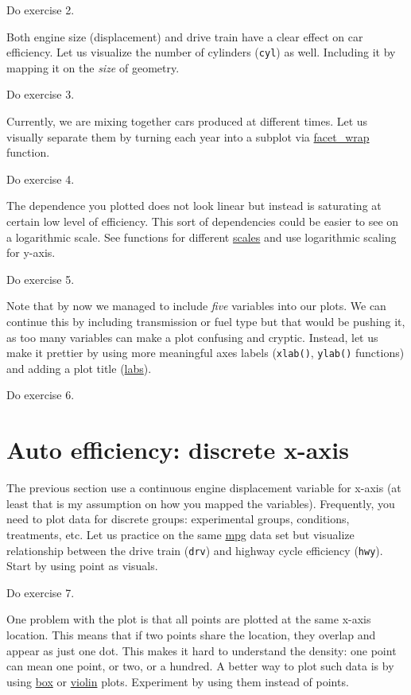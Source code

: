 \documentclass[
]{book}
\begin{document}
Do exercise 2.

Both engine size (displacement) and drive train have a clear effect on car efficiency. Let us visualize the number of cylinders (\texttt{cyl}) as well. Including it by mapping it on the \emph{size} of geometry.

Do exercise 3.

Currently, we are mixing together cars produced at different times. Let us visually separate them by turning each year into a subplot via \href{https://ggplot2.tidyverse.org/reference/facet_wrap.html}{facet\_wrap} function.

Do exercise 4.

The dependence you plotted does not look linear but instead is saturating at certain low level of efficiency. This sort of dependencies could be easier to see on a logarithmic scale. See functions for different \href{https://ggplot2.tidyverse.org/reference/scale_continuous.html}{scales} and use logarithmic scaling for y-axis.

Do exercise 5.

Note that by now we managed to include \emph{five} variables into our plots. We can continue this by including transmission or fuel type but that would be pushing it, as too many variables can make a plot confusing and cryptic. Instead, let us make it prettier by using more meaningful axes labels (\texttt{xlab()}, \texttt{ylab()} functions) and adding a plot title (\href{https://ggplot2.tidyverse.org/reference/labs.html}{labs}).

Do exercise 6.

\hypertarget{auto-efficiency-discrete-x-axis}{%
\section{Auto efficiency: discrete x-axis}\label{auto-efficiency-discrete-x-axis}}

The previous section use a continuous engine displacement variable for x-axis (at least that is my assumption on how you mapped the variables). Frequently, you need to plot data for discrete groups: experimental groups, conditions, treatments, etc. Let us practice on the same \href{https://ggplot2.tidyverse.org/reference/mpg.html}{mpg} data set but visualize relationship between the drive train (\texttt{drv}) and highway cycle efficiency (\texttt{hwy}). Start by using point as visuals.

Do exercise 7.

One problem with the plot is that all points are plotted at the same x-axis location. This means that if two points share the location, they overlap and appear as just one dot. This makes it hard to understand the density: one point can mean one point, or two, or a hundred. A better way to plot such data is by using \href{https://ggplot2.tidyverse.org/reference/geom_boxplot.html}{box} or \href{https://ggplot2.tidyverse.org/reference/geom_violin.html}{violin} plots. Experiment by using them instead of points.
\end{document}
